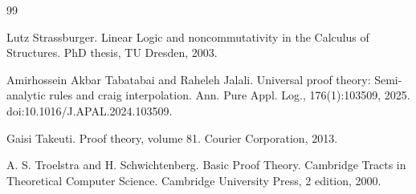 \documentclass[10pt,a4paper]{article}
\begin{document}
\begin{thebibliography}{99}
\par\noindent    Lutz Strassburger.  Linear Logic and noncommutativity in the Calculus of Structures.  PhD thesis, TU Dresden, 2003.  

\par\noindent    Amirhossein Akbar Tabatabai and Raheleh Jalali.  Universal proof theory: Semi-analytic rules and craig interpolation.  Ann. Pure Appl. Log., 176(1):103509, 2025.  doi:10.1016/J.APAL.2024.103509.  

\par\noindent    Gaisi Takeuti.  Proof theory, volume 81.  Courier Corporation, 2013.  

\par\noindent    A. S. Troelstra and H. Schwichtenberg.  Basic Proof Theory.  Cambridge Tracts in Theoretical Computer Science. Cambridge University Press, 2 edition, 2000.  

\end{thebibliography}
\end{document}
